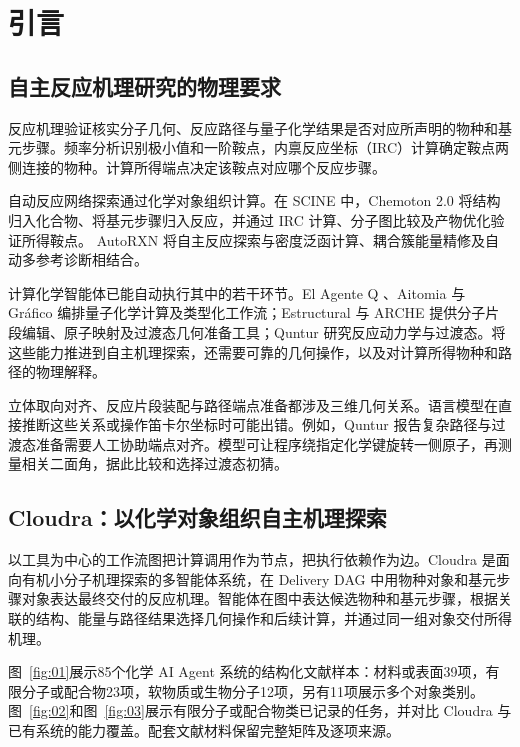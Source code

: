 \section{引言}

\subsection{自主反应机理研究的物理要求}

反应机理验证核实分子几何、反应路径与量子化学结果是否对应所声明的物种和基元步骤。频率分析识别极小值和一阶鞍点，内禀反应坐标（IRC）计算确定鞍点两侧连接的物种。计算所得端点决定该鞍点对应哪个反应步骤。\citep{ref09,ref10}

自动反应网络探索通过化学对象组织计算。在 SCINE 中，Chemoton 2.0 将结构归入化合物、将基元步骤归入反应，并通过 IRC 计算、分子图比较及产物优化验证所得鞍点。\citep{chemoton2022} AutoRXN 将自主反应探索与密度泛函计算、耦合簇能量精修及自动多参考诊断相结合。\citep{autorxn2023}

计算化学智能体已能自动执行其中的若干环节。El Agente Q \citep{ref01}、Aitomia \citep{ref02} 与 Gráfico \citep{ref06} 编排量子化学计算及类型化工作流；Estructural \citep{ref04} 与 ARCHE \citep{ref05} 提供分子片段编辑、原子映射及过渡态几何准备工具；Quntur \citep{ref03} 研究反应动力学与过渡态。将这些能力推进到自主机理探索，还需要可靠的几何操作，以及对计算所得物种和路径的物理解释。

立体取向对齐、反应片段装配与路径端点准备都涉及三维几何关系。语言模型在直接推断这些关系或操作笛卡尔坐标时可能出错。例如，Quntur \citep{ref03} 报告复杂路径与过渡态准备需要人工协助端点对齐。模型可让程序绕指定化学键旋转一侧原子，再测量相关二面角，据此比较和选择过渡态初猜。

\subsection{Cloudra：以化学对象组织自主机理探索}

以工具为中心的工作流图把计算调用作为节点，把执行依赖作为边。Cloudra 是面向有机小分子机理探索的多智能体系统，在 Delivery DAG 中用物种对象和基元步骤对象表达最终交付的反应机理。智能体在图中表达候选物种和基元步骤，根据关联的结构、能量与路径结果选择几何操作和后续计算，并通过同一组对象交付所得机理。

图~\ref{fig:01}展示85个化学 AI Agent 系统的结构化文献样本：材料或表面39项，有限分子或配合物23项，软物质或生物分子12项，另有11项展示多个对象类别。图~\ref{fig:02}和图~\ref{fig:03}展示有限分子或配合物类已记录的任务，并对比 Cloudra 与已有系统的能力覆盖。配套文献材料保留完整矩阵及逐项来源。

